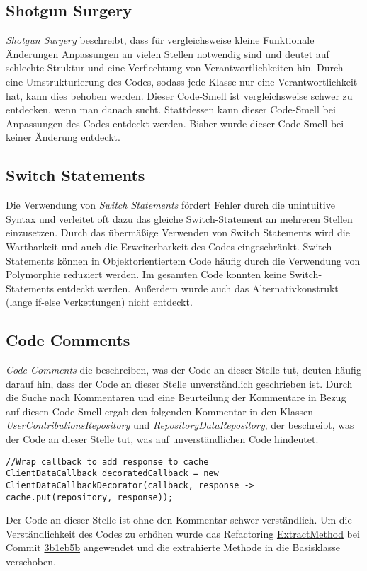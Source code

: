 \subsection{Shotgun Surgery}

\textit{Shotgun Surgery} beschreibt, dass für vergleichsweise kleine Funktionale Änderungen Anpassungen an vielen Stellen notwendig sind und deutet auf schlechte Struktur und eine Verflechtung von Verantwortlichkeiten hin.
Durch eine Umstrukturierung des Codes, sodass jede Klasse nur eine Verantwortlichkeit hat, kann dies behoben werden.
\newline
\newline
Dieser Code-Smell ist vergleichsweise schwer zu entdecken, wenn man danach sucht. Stattdessen kann dieser Code-Smell bei Anpassungen des Codes entdeckt werden.
Bisher wurde dieser Code-Smell bei keiner Änderung entdeckt.

\subsection{Switch Statements}

Die Verwendung von \textit{Switch Statements} fördert Fehler durch die unintuitive Syntax und verleitet oft dazu das gleiche Switch-Statement an mehreren Stellen einzusetzen.
Durch das übermäßige Verwenden von Switch Statements wird die Wartbarkeit und auch die Erweiterbarkeit des Codes eingeschränkt.
Switch Statements können in Objektorientiertem Code häufig durch die Verwendung von Polymorphie reduziert werden.
\newline
\newline
Im gesamten Code konnten keine Switch-Statements entdeckt werden. Außerdem wurde auch das Alternativkonstrukt (lange if-else Verkettungen) nicht entdeckt.

\subsection{Code Comments}

\textit{Code Comments} die beschreiben, was der Code an dieser Stelle tut, deuten häufig darauf hin, dass der Code an dieser Stelle unverständlich geschrieben ist.
\newline
\newline
Durch die Suche nach Kommentaren und eine Beurteilung der Kommentare in Bezug auf diesen Code-Smell ergab den folgenden Kommentar in den Klassen \textit{UserContributionsRepository} und \textit{RepositoryDataRepository}, der beschreibt, was der Code an dieser Stelle tut, was auf unverständlichen Code hindeutet.
\begin{lstlisting}
//Wrap callback to add response to cache
ClientDataCallback decoratedCallback = new ClientDataCallbackDecorator(callback, response ->  cache.put(repository, response));
\end{lstlisting}
Der Code an dieser Stelle ist ohne den Kommentar schwer verständlich. Um die Verständlichkeit des Codes zu erhöhen wurde das Refactoring {\hyperref[sec:ExtractMethod_Repository]{ExtractMethod}} bei Commit \href{https://github.com/lukaspanni/OpenSourceStats/commit/3b1eb5bf6750c3ccaeb05962ec8a8ae743adbf2c} {3b1eb5b} angewendet und die extrahierte Methode in die Basisklasse verschoben.


